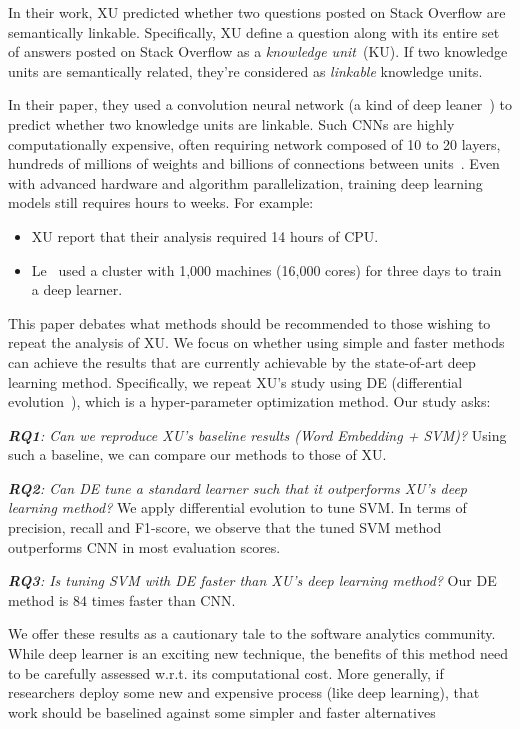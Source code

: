 \documentclass[sigconf,review, anonymous]{acmart}
\theoremstyle{break}
\newcommand{\bi}{\begin{itemize}[leftmargin=0.4cm]}
\newcommand{\ei}{\end{itemize}}
\begin{document}
 In their work, XU predicted whether two questions posted on Stack Overflow are semantically linkable. 
Specifically, XU define a question along with its entire set of answers posted on Stack Overflow
as a {\it knowledge unit}~(KU). If two knowledge units are semantically related, they're considered
as {\it linkable} knowledge units. 

In their paper, they used a convolution neural
network (a kind of deep leaner~\cite{lecun2015deep}) to predict whether two knowledge units are linkable. Such 
CNNs are highly computationally expensive,
often requiring network composed of 10 to 20 layers, hundreds of millions of weights and billions of connections between units~\cite{lecun2015deep}. Even with
advanced hardware and algorithm parallelization, training deep learning models still requires hours to weeks.
For example:
\bi
\item
XU report that their analysis
required 14 hours of CPU.
\item
Le~\cite{le2013building} used  a cluster with 1,000 machines (16,000 cores) for three days to train a deep learner.
\ei
 
This paper debates what methods should be recommended
to those wishing to repeat the analysis of XU. We focus on whether using simple and faster methods can achieve
the results that are currently achievable by the state-of-art deep learning method.
Specifically, we repeat XU's
study using  DE  (differential evolution~\cite{storn1997differential}),
which is a hyper-parameter optimization
method.
Our study asks:


{\it \textbf{RQ1}: Can we reproduce XU's baseline results (Word Embedding + SVM)?}
Using such a baseline, we can compare our methods to those of XU.
 
 {\it \textbf{RQ2}: Can   DE   tune a standard learner such that
 it outperforms
  XU's deep learning method?}
 We apply differential evolution  to tune SVM. In terms of precision, recall and F1-score, we observe that the tuned SVM method outperforms CNN in most evaluation scores.

{\it \textbf{RQ3}: Is tuning SVM with DE faster than XU's deep learning method?}
Our   DE method
 is  $84$ times faster than CNN. 
 
We offer these results as a cautionary tale to the software analytics community.
While deep learner is an exciting new technique, the benefits of this
method need to be carefully assessed w.r.t. its computational cost. 
More generally,
if researchers deploy some new and expensive process (like deep learning), that work should be baselined against some simpler and faster alternatives
 
\end{document}
